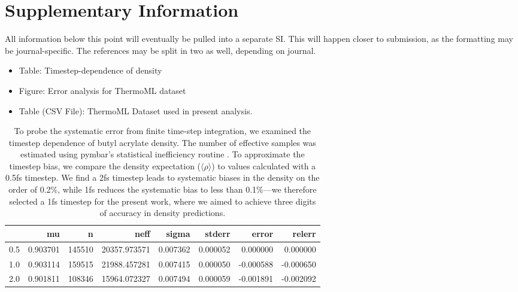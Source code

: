 \documentclass[journal=jacsat,manuscript=article]{achemso}
\begin{document}
\section{Supplementary Information}

All information below this point will eventually be pulled into a separate SI.  This will happen closer to submission, as the formatting may be journal-specific.  The references may be split in two as well, depending on journal.

\begin{itemize}
 \item Table: Timestep-dependence of density
 \item Figure: Error analysis for ThermoML dataset
 \item Table (CSV File): ThermoML Dataset used in present analysis.
\end{itemize}


\begin{table}
\begin{tabular}{lrrrrrrr}
\toprule
{} &        mu &       n &          neff &     sigma &    stderr &     error &    relerr \\
\midrule
0.5 &  0.903701 &  145510 &  20357.973571 &  0.007362 &  0.000052 &  0.000000 &  0.000000 \\
1.0 &  0.903114 &  159515 &  21988.457281 &  0.007415 &  0.000050 & -0.000588 & -0.000650 \\
2.0 &  0.901811 &  108346 &  15964.072327 &  0.007494 &  0.000059 & -0.001891 & -0.002092 \\
\bottomrule
\end{tabular}
\caption{To probe the systematic error from finite time-step integration, we examined the timestep dependence of butyl acrylate density.  The number of effective samples was estimated using pymbar's statistical inefficiency routine \cite{shirts2008statistically}.  To approximate the timestep bias, we compare the density expectation ($\langle \rho \rangle$) to values calculated with a 0.5fs timestep.  We find a 2fs timestep leads to systematic biases in the density on the order of 0.2\%, while 1fs reduces the systematic bias to less than 0.1\%---we therefore selected a 1fs timestep for the present work, where we aimed to achieve three digits of accuracy in density predictions.
}
\label{table:TimestepDependence}
\end{table}
\end{document}
